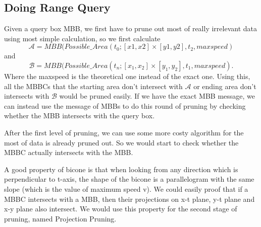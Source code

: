 \documentclass[sigplan]{acmart}
\begin{document}
\subsection{Doing Range Query}

Given a query box MBB, we first have to prune out most of really irrelevant data using most simple calculation, so we first calculate
$$\mathcal{A} = MBB(Possible\_Area(t_0;[x1,x2] \times [y1,y2], t_2, maxspeed)$$
and
$$\mathcal{B} = MBB(Possible\_Area(t_n;[x_1,x_2] \times [y_1,y_2], t_1, maxspeed).$$
Where the maxspeed is the theoretical one instead of the exact one. Using this, all the MBBCs that the starting area don't intersect with $\mathcal{A}$ or ending area don't intersects with $\mathcal{B}$ would be pruned easily. If we have the exact MBB message, we can instead use the message of MBBs to do this round of pruning by checking whether the MBB intersects with the query box. \par
After the first level of pruning, we can use some more costy algorithm for the most of data is already pruned out. So we would start to check whether the MBBC actually intersects with the MBB.\par
A good property of bicone is that when looking from any direction which is perpendicular to t-axis, the shape of the bicone is a parallelogram with the same slope (which is the value of maximum speed v). We could easily proof that if a MBBC intersects with a MBB, then their projections on x-t plane, y-t plane and x-y plane also intersect. We would use this property for the second stage of pruning, named Projection Pruning. \par
\end{document}
